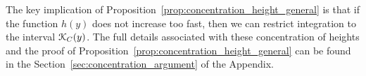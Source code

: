 The key implication of Proposition~\ref{prop:concentration_height_general} is that if the function $h(y)$ does not increase too fast, then we can restrict integration to the interval ${\mathcal K}_C(y)$. The full details associated with these concentration of heights and the proof of Proposition~\ref{prop:concentration_height_general} can be found in the Section~\ref{sec:concentration_argument} of the Appendix.

 
%
%
%
%

% 
% 

